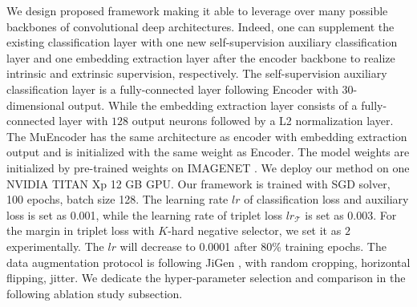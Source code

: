 We design proposed framework making it able to leverage over many possible backbones of convolutional deep architectures.
Indeed, one can supplement the existing classification layer with one new self-supervision auxiliary classification layer and one embedding extraction layer after the encoder backbone to realize intrinsic and extrinsic supervision, respectively.
The self-supervision auxiliary classification layer is a fully-connected layer following Encoder with $30$-dimensional output.
While the embedding extraction layer consists of a fully-connected layer with $128$ output neurons followed by a L2 normalization layer.
The MuEncoder has the same architecture as encoder with embedding extraction output and is initialized with the same weight as Encoder.
The model weights are initialized by pre-trained weights on IMAGENET \cite{deng2009imagenet}.
We deploy our method on one NVIDIA TITAN Xp 12 GB GPU.
Our framework is trained with SGD solver, 100 epochs, batch size 128.
The learning rate $lr$ of classification loss and auxiliary loss is set as 0.001, while the learning rate of triplet loss $lr_\mathcal{T}$ is set as 0.003.
For the margin in triplet loss with $K$-hard negative selector, we set it as $2$ experimentally.
The $lr$ will decrease to 0.0001 after 80\% training epochs.
The data augmentation protocol is following JiGen \cite{carlucci2019domain}, with random cropping, horizontal flipping, jitter.
We dedicate the hyper-parameter selection and comparison in the following ablation study subsection.
\fi 


